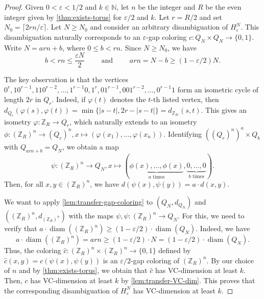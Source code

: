 \documentclass[11pt]{article}
\DeclareMathOperator{\diam}{diam}
\theoremstyle{remark}
\begin{document}
\begin{proof}
    Given $0 < \varepsilon < 1/2$ and $k \in \mathbb{N}$, let $n$ be the integer and $R$ be the even integer given by \cref{thm:exists-torus} for $\varepsilon/2$ and $k$.
    Let $r = R/2$ and set $N_0=\lceil 2rn/\varepsilon\rceil$.
    Let $N \geq N_0$ and consider an arbitrary disambiguation of $H_{\varepsilon}^N$.
    This disambiguation naturally corresponds to an $\varepsilon$-gap coloring $c : Q_N \times Q_N \to \{0, 1\}$.
    Write $N=arn+b$, where $0\leq b<rn$.
    Since $N\geq N_0$, we have 
    \[b<rn\leq\frac{\varepsilon N}{2} \qquad \text{ and } \qquad arn=N-b\geq(1-\varepsilon/2)N.\]
    
    The key observation is that the vertices $0^r, 10^{r-1}, 110^{r-2}, \ldots, 1^{r-1}0, 1^r, 01^{r-1}, 001^{r-2}, \ldots, 0^{r-1}1$ form an isometric cycle of length $2r$ in $Q_r$.
    Indeed, if $\varphi(t)$ denotes the $t$-th listed vertex, then $d_{Q_r}(\varphi(s), \varphi(t)) = \min\{|s-t|, 2r-|s-t|\} = d_{\mathbb{Z}_{2r}}(s, t)$.
    This gives an isometry $\varphi : \mathbb{Z}_R \to Q_r$, which naturally extends to an isometry $\phi : (\mathbb{Z}_R)^{n} \to (Q_r)^{n}, x \mapsto (\varphi(x_1), \ldots, \varphi(x_{n}))$.
    Identifying $((Q_r)^{n})^a \times Q_b$ with $Q_{arn+b} = Q_N$, we obtain a map \[\psi : (\mathbb{Z}_R)^n \to Q_N, x \mapsto (\underbrace{\phi(x),\ldots,\phi(x)}_{a\text{ times}},\underbrace{0,\ldots,0}_{b\text{ times}}).
    \]
    Then, for all $x, y \in (\mathbb{Z}_R)^n$, we have $d(\psi(x), \psi(y)) = a \cdot d(x, y)$.
    
    We want to apply \cref{lem:transfer-gap-coloring} to $(Q_N, d_{Q_N})$ and $((\mathbb{Z}_R)^n, d_{(\mathbb{Z}_R)^n})$ with the maps $\psi, \psi : (\mathbb{Z}_R)^n \to Q_N$.
    For this, we need to verify that $a \cdot \diam((\mathbb{Z}_R)^n) \geq (1 - \varepsilon/2) \cdot \diam(Q_N)$.
    Indeed, we have \[a \cdot \diam((\mathbb{Z}_R)^n) = arn \geq (1-\varepsilon/2) \cdot N = (1 - \varepsilon/2) \cdot \diam(Q_N).\]
    Thus, the coloring $\widehat{c} : (\mathbb{Z}_R)^n \times (\mathbb{Z}_R)^n \to \{0, 1\}$ defined by $\widehat{c}(x, y) = c(\psi(x), \psi(y))$ is an $\varepsilon/2$-gap coloring of $(\mathbb{Z}_R)^n$.
    By our choice of $n$ and by \cref{thm:exists-torus}, we obtain that $\widehat{c}$ has VC-dimension at least $k$.
    Then, $c$ has VC-dimension at least $k$ by \cref{lem:transfer-VC-dim}.
    This proves that the corresponding disambiguation of $H_{\varepsilon}^N$ has VC-dimension at least $k$.
\end{proof}
\end{document}
